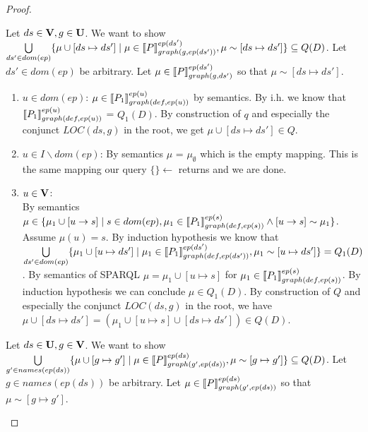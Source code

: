 \begin{proof}
\begin{enumerate}
			\bigskip\noindent
			Let $ds \in \mathbf{V},g \in \mathbf{U}$.
			We want to show  
			$\bigcup\limits_{ds' \in dom(ep)} \{ \mu \cup [ds \mapsto ds'] \mid \mu \in
			\llbracket P\rrbracket^{ep(ds')}_{graph(g,ep(ds'))}, \mu \sim  [ds\mapsto ds'] \}  
			\subseteq Q(D)$.
			Let $ds' \in dom(ep)$ be arbitrary.
			Let $\mu \in \llbracket P \rrbracket^{ep(ds')}_{graph(g,ds')}$ so that $\mu \sim
			[ds\mapsto ds']$.
			\begin{enumerate}
				\item  $u \in dom(ep)$:
					$\mu \in \llbracket P_1\rrbracket^{ep(u)}_{graph(def,ep(u))}$ by semantics.
					By i.h. we know that 
					$\llbracket P_1 \rrbracket^{ep(u)}_{graph(def,ep(u))}$ =
					$Q_1(D)$. By construction of $q$ and especially the conjunct
					$LOC(ds,g)$ in the root, we get $\mu\cup[ds \mapsto ds'] \in Q$.
				\item $u \in I\backslash dom(ep)$:
					By semantics $\mu$ = $\mu_\emptyset$ which is the empty
					mapping. This is the same mapping our query
					$\{\} \leftarrow$ returns and we are
					done.
				\item $u \in \mathbf{V}$:\\
					By semantics $\mu \in \{ \mu_1 \cup [u \rightarrow s ] \mid
						s \in dom(ep), \mu_1 \in \llbracket P_1
						\rrbracket^{ep(s)}_{graph(def,ep(s))} \land
					[u \rightarrow s] \sim \mu_1 \}$. Assume $\mu(u) = s$.
					By induction hypothesis we know that 
					$\bigcup\limits_{ds' \in dom(ep)} \{ \mu_1 \cup [u
						\mapsto ds'] \mid \mu_1 \in
						\llbracket P_1\rrbracket^{ep(ds')}_{graph(def,ep(ds'))},
					\mu_1 \sim [u\mapsto ds'] \}  =
					Q_1(D) $. By semantics of SPARQL $\mu = \mu_1 \cup
					[u \mapsto s]$ for $\mu_1 \in \llbracket P_1 \rrbracket^{ep(s)}_{graph(def,ep(s))}$.
					By induction hypothesis we can conclude
					$\mu \in Q_1(D)$.
					By construction of $Q$ and especially the conjunct
					$LOC(ds,g)$ in the root, we have 
					$\mu \cup [ds\mapsto ds'] = (\mu_1 \cup [u
					\mapsto s] \cup [ds \mapsto ds']) \in Q(D)$. 
			\end{enumerate}

			\bigskip\noindent
			Let $ds \in \mathbf{U},g \in \mathbf{V}$.
			We want to show  $\bigcup\limits_{g' \in names(ep(ds))}\{ \mu \cup [g
				\mapsto g'] \mid \mu \in \llbracket P\rrbracket^{ep(ds)}_{graph(g',ep(ds))},
			\mu \sim	[g\mapsto g'] \} \subseteq Q(D)$.
			Let $g \in names(ep(ds))$ be arbitrary.
			Let $\mu \in \llbracket P \rrbracket^{ep(ds)}_{graph(g',ep(ds))}$ so that $\mu \sim
			[g\mapsto g']$.


\end{enumerate}
\end{proof}
